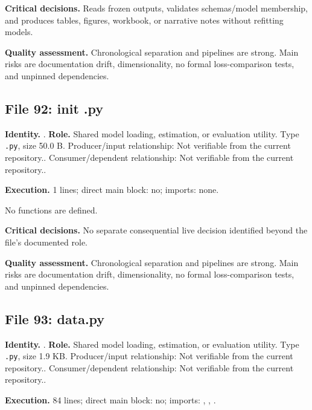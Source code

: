 \documentclass[
  11pt,
  a4paper]{article}
\newcounter{none} %
\begin{document}
\textbf{Critical decisions.} Reads frozen outputs, validates
schemas/model membership, and produces tables, figures, workbook, or
narrative notes without refitting models.

\textbf{Quality assessment.} Chronological separation and pipelines are
strong. Main risks are documentation drift, dimensionality, no formal
loss-comparison tests, and unpinned dependencies.

\subsection{File 92: init .py}\label{file-7121830631268208801}

\textbf{Identity.} . \textbf{Role.}
Shared model loading, estimation, or evaluation utility. Type
\texttt{.py}, size 50.0 B. Producer/input relationship: Not verifiable
from the current repository.. Consumer/dependent relationship: Not
verifiable from the current repository..

\textbf{Execution.} 1 lines; direct main block: no; imports: none.

No functions are defined.

\textbf{Critical decisions.} No separate consequential live decision
identified beyond the file's documented role.

\textbf{Quality assessment.} Chronological separation and pipelines are
strong. Main risks are documentation drift, dimensionality, no formal
loss-comparison tests, and unpinned dependencies.

\subsection{File 93: data.py}\label{file-16545832992816383}

\textbf{Identity.} . \textbf{Role.}
Shared model loading, estimation, or evaluation utility. Type
\texttt{.py}, size 1.9 KB. Producer/input relationship: Not verifiable
from the current repository.. Consumer/dependent relationship: Not
verifiable from the current repository..

\textbf{Execution.} 84 lines; direct main block: no; imports:
, ,
.
\end{document}
